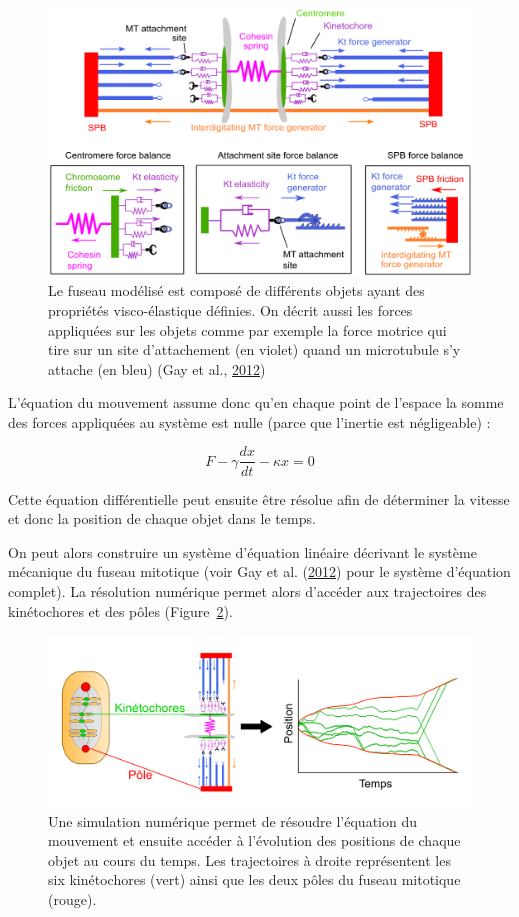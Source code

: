 \documentclass[12pt,a4paper,twoside,openright]{book}
\begin{document}
\begin{figure}[htbp]
\centering
\includegraphics{figures/intro/spindle_model.png}
\caption[Modélisation mécanique du fuseau mitotique]{\label{fig:spindle_model}Le
fuseau modélisé est composé de différents objets ayant des propriétés
visco-élastique définies. On décrit aussi les forces appliquées sur les
objets comme par exemple la force motrice qui tire sur un site
d'attachement (en violet) quand un microtubule s'y attache (en bleu)
(Gay et al., \protect\hyperlink{ref-Gay2012a}{2012})}
\end{figure}

L'équation du mouvement assume donc qu'en chaque point de l'espace la
somme des forces appliquées au système est nulle (parce que l'inertie
est négligeable) :

\[
F - \gamma\frac{dx}{dt} - \kappa x = 0
\]

Cette équation différentielle peut ensuite être résolue afin de
déterminer la vitesse et donc la position de chaque objet dans le temps.

On peut alors construire un système d'équation linéaire décrivant le
système mécanique du fuseau mitotique (voir Gay et al.
(\protect\hyperlink{ref-Gay2012a}{2012}) pour le système d'équation
complet). La résolution numérique permet alors d'accéder aux
trajectoires des kinétochores et des pôles
(Figure~\ref{fig:traj_model}).

\begin{figure}[htbp]
\centering
\includegraphics{figures/intro/traj_model.png}
\caption[Trajectoire des chromosomes \_in silico\_]{\label{fig:traj_model}Une
simulation numérique permet de résoudre l'équation du mouvement et
ensuite accéder à l'évolution des positions de chaque objet au cours du
temps. Les trajectoires à droite représentent les six kinétochores
(vert) ainsi que les deux pôles du fuseau mitotique (rouge).}
\end{figure}
\end{document}
